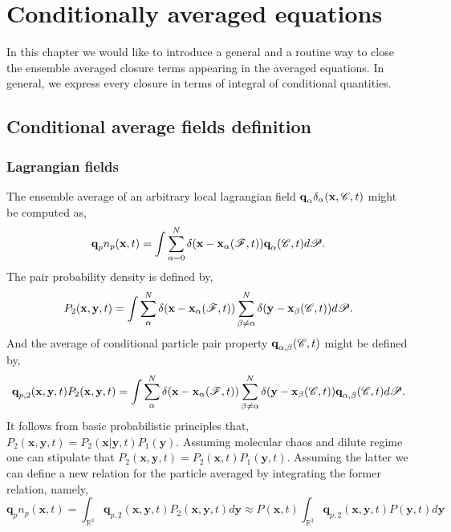 \chapter{Conditionally averaged equations}

In this chapter we would like to introduce a general and a routine way to close the ensemble averaged closure terms appearing in the averaged equations. 
In general, we express every closure in terms of integral of conditional quantities. 

\section{Conditional average fields definition}

\subsection{Lagrangian fields}
The ensemble average of an arbitrary local lagrangian field $\textbf{q}_\alpha\delta_\alpha(\textbf{x},\mathscr{C},t)$ might be computed as,
\begin{equation*}
    \textbf{q}_pn_p(\textbf{x},t)
    = \int
    \sum_{\alpha=0}^N
    \delta(\textbf{x} - \textbf{x}_\alpha(\mathscr{F},t))
     \textbf{q}_\alpha(\mathscr{C},t) 
     d\mathscr{P}. 
\end{equation*}
The pair probability density is defined by, 
\begin{equation*}
    P_2(\textbf{x},\textbf{y},t)
    = \int
    \sum_{\alpha}^N
    \delta(\textbf{x} - \textbf{x}_\alpha(\mathscr{F},t))
    \sum_{\beta\neq\alpha}^N
    \delta(\textbf{y} - \textbf{x}_\beta(\mathscr{C},t))
     d\mathscr{P}. 
\end{equation*}
And the average of conditional particle pair property $\textbf{q}_{\alpha,\beta}(\mathscr{C},t)$ might be defined by, 
\begin{equation*}
    \textbf{q}_{p,2}(\textbf{x},\textbf{y},t) P_2(\textbf{x},\textbf{y},t)
    = \int
    \sum_{\alpha}^N
    \delta(\textbf{x} - \textbf{x}_\alpha(\mathscr{F},t))
    \sum_{\beta\neq\alpha}^N
    \delta(\textbf{y} - \textbf{x}_\beta(\mathscr{C},t))
    \textbf{q}_{\alpha,\beta}(\mathscr{C},t) 
     d\mathscr{P}. 
\end{equation*}
It follows from basic probabilistic principles that, $P_2(\textbf{x},\textbf{y},t) = P_2(\textbf{x}|\textbf{y},t)P_1(\textbf{y})$. 
Assuming molecular chaos and dilute regime one can stipulate that $P_2(\textbf{x},\textbf{y},t) = P_2(\textbf{x},t)P_1(\textbf{y},t)$. 
Assuming the latter we can define a new relation for the particle averaged by integrating the former relation, namely, 
\begin{equation*}
    \textbf{q}_pn_p(\textbf{x},t)
    =
    \int_{\mathbb{R}^3}
    \textbf{q}_{p,2}(\textbf{x},\textbf{y},t) P_2(\textbf{x},\textbf{y},t)
    d\textbf{y}
    \approx
    P(\textbf{x},t)
    \int_{\mathbb{R}^3}
    \textbf{q}_{p,2}(\textbf{x},\textbf{y},t) P(\textbf{y},t)
    d\textbf{y}
\end{equation*}


